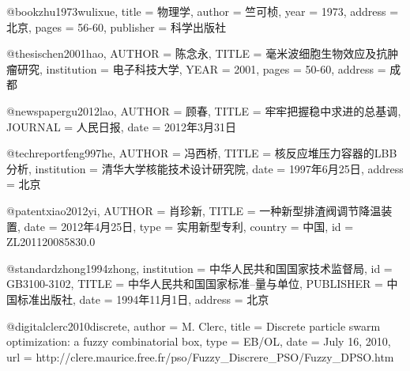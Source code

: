 
@book{zhu1973wulixue,
  title = {物理学},
  author = {竺可桢},
  year = {1973},
  address = {北京},
  pages = {56-60},
  publisher = {科学出版社}
}


@thesis{chen2001hao,
  AUTHOR = {陈念永},
  TITLE = {毫米波细胞生物效应及抗肿瘤研究},
  institution = {电子科技大学},
  YEAR = {2001},
  pages = {50-60},
  address = {成都}
}


@newspaper{gu2012lao,
  AUTHOR = {顾春},
  TITLE = {牢牢把握稳中求进的总基调},
  JOURNAL = {人民日报},
  date = {2012年3月31日}
}


@techreport{feng997he,
  AUTHOR = {冯西桥},
  TITLE = {核反应堆压力容器的{LBB}分析},
  institution = {清华大学核能技术设计研究院},
  date = {1997年6月25日},
  address = {北京}
}


@patent{xiao2012yi,
  AUTHOR = {肖珍新},
  TITLE = {一种新型排渣阀调节降温装置},
  date = {2012年4月25日},
  type = {实用新型专利},
  country = {中国},
  id = {ZL201120085830.0}
}


@standard{zhong1994zhong,
  institution = {中华人民共和国国家技术监督局},
  id = {GB3100-3102},
  TITLE = {中华人民共和国国家标准--量与单位},
  PUBLISHER = {中国标准出版社},
  date = {1994年11月1日},
  address = {北京}
}

@digital{clerc2010discrete,
  author = {M. Clerc},
  title = {Discrete particle swarm optimization: a fuzzy combinatorial box},
  type = {EB/OL},
  date = {July 16, 2010},
  url = {http://clere.maurice.free.fr/pso/Fuzzy_Discrere_PSO/Fuzzy_DPSO.htm}
}
